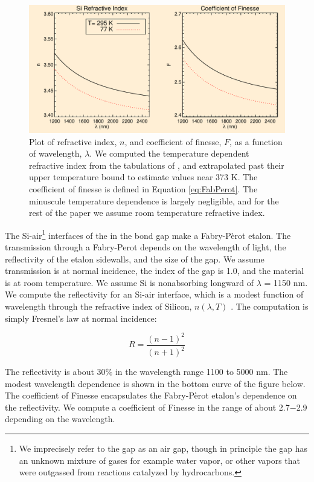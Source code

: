 \documentclass[osajnl,preprint,showpacs,superscriptaddress,12pt]{revtex4-1} %
\begin{document}
\begin{figure}[htbp]
\centerline{\includegraphics[width=0.95\columnwidth]{figs/SiIndexAOmgsFinesseFig.pdf}}
\caption{Plot of refractive index, $n$, and coefficient of finesse, $F$, as a function of wavelength, $\lambda$.\label{fig} We computed the temperature dependent refractive index from the tabulations of \cite{2006SPIE.6273E..77F}, and extrapolated past their upper temperature bound to estimate values near 373 K.  The coefficient of finesse is defined in Equation \ref{eq:FabPerot}.  The minuscule temperature dependence is largely negligible, and for the rest of the paper we assume room temperature refractive index.}
\end{figure}

The Si-air\footnote{We imprecisely refer to the gap as an air gap, though in principle the gap has an unknown mixture of gases for example water vapor, or other vapors that were outgassed from reactions catalyzed by hydrocarbons.} interfaces of the in the bond gap make a Fabry-P\`erot etalon\cite{2007fuph.book.....S}.  The transmission through a Fabry-Perot depends on the wavelength of light, the reflectivity of the etalon sidewalls, and the size of the gap.  We assume transmission is at normal incidence, the index of the gap is 1.0, and the material is at room temperature.  We assume Si is nonabsorbing longward of $\lambda$ = 1150 nm.  We compute the reflectivity for an Si-air interface, which is a modest function of wavelength through the refractive index of Silicon, $n(\lambda, T)$ \cite{2006SPIE.6273E..77F}.  The computation is simply Fresnel's law at normal incidence:

$$
R = \frac{(n-1)^2}{(n+1)^2}
$$

The reflectivity is about 30\% in the wavelength range 1100 to 5000 nm.  The modest wavelength dependence is shown in the bottom curve of the figure below.  The coefficient of Finesse\cite{2007fuph.book.....S} encapsulates the Fabry-P\`erot etalon's dependence on the reflectivity.  We compute a coefficient of Finesse in the range of about 2.7$-$2.9 depending on the wavelength.
\end{document}
